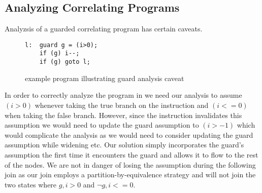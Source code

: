 \subsection{Analyzing Correlating Programs}
Analyzsis of a guarded correlating program has certain caveats.
\begin{figure}[ht]
\begin{lstlisting}
l:  guard g = (i>0);
    if (g) i--;
    if (g) goto l;
\end{lstlisting}
\caption{example program illustrating guard analysis caveat}
\end{figure}
In order to correctly analyze the program in  we need our analysis to assume $(i>0)$ whenever taking the true branch on the  instruction and $(i<=0)$ when taking the false branch. However, since the  instruction invalidates this assumption we would need to update the guard assumption to $(i>-1)$ which would complicate the analysis as we would need to consider updating the guard assumption while widening etc. Our solution simply incorporates the guard's assumption the first time it encounters the guard and allows it to flow to the rest of the nodes. We are not in danger of losing the assumption during the following join as our join employs a partition-by-equivalence strategy and will not join the two states where ${g,i>0}$ and ${\neg{g},i<=0}$.

